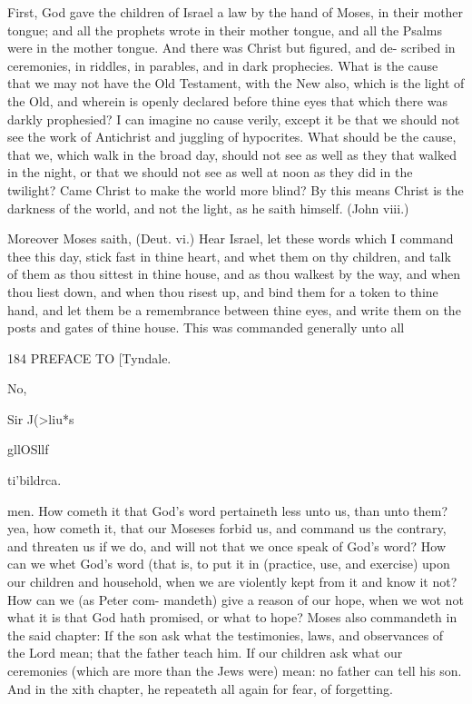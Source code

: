 \documentclass{custom}
\begin{document}
First, God gave the children of Israel a law 
by the hand of Moses, in their mother tongue;
and all the prophets wrote in their mother 
tongue, and all the Psalms were in the mother 
tongue. And there was Christ but figured, and de- 
scribed in ceremonies, in riddles, in parables, and 
in dark prophecies. What is the cause that we 
may not have the Old Testament, with the New 
also, which is the light of the Old, and wherein 
is openly declared before thine eyes that which 
there was darkly prophesied? I can imagine no 
cause verily, except it be that we should not see 
the work of Antichrist and juggling of hypocrites. 
What should be the cause, that we, which walk 
in the broad day, should not see as well as they 
that walked in the night, or that we should not 
see as well at noon as they did in the twilight?
Came Christ to make the world more blind? By 
this means Christ is the darkness of the world, 
and not the light, as he saith himself. (John viii.)

Moreover Moses saith, (Deut. vi.) Hear Israel,
let these words which I command thee this day,
stick fast in thine heart, and whet them on thy
children, and talk of them as thou sittest in thine
house, and as thou walkest by the way, and when
thou liest down, and when thou risest up, and
bind them for a token to thine hand, and let 
them be a remembrance between thine eyes, 
and write them on the posts and gates of thine 
house. This was commanded generally unto all 


184
PREFACE TO 
[Tyndale.

No, 

Sir J(>liu*s 

gllOSllf 

ti'bildrca. 

men. How cometh it that God's word pertaineth
less unto us, than unto them? yea, how cometh 
it, that our Moseses forbid us, and command us 
the contrary, and threaten us if we do, and will 
not that we once speak of God's word? How 
can we whet God's word (that is, to put it in
(practice, use, and exercise) upon our children 
and household, when we are violently kept from 
it and know it not? How can we (as Peter com-
mandeth) give a reason of our hope, when we 
wot not what it is that God hath promised, or 
what to hope? Moses also commandeth in the 
said chapter: If the son ask what the testimonies,
laws, and observances of the Lord mean; that 
the father teach him. If our children ask what 
our ceremonies (which are more than the Jews 
were) mean: no father can tell his son. And in 
the xith chapter, he repeateth all again for fear,
of forgetting.
\end{document}
